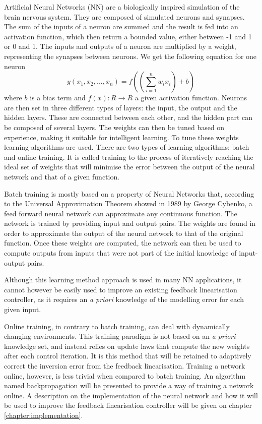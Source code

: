 Artificial Neural Networks (NN) are a biologically inspired simulation of the brain nervous system. They are composed of simulated neurons and synapses. The sum of the inputs of a neuron are summed and the result is fed into an activation function, which then return a bounded value, either between -1 and 1 or 0 and 1. The inputs and outputs of a neuron are multiplied by a weight, representing the synapses between neurons. We get the following equation for one neuron
\begin{equation}
y(x_1,x_2,...,x_n)=f((\sum ^n_{i=1} w_i x_i)+b)
\end{equation}
where $b$ is a bias term and $f(x):R\rightarrow R$ a given activation function. Neurons are then set in three different types of layers: the input, the output and the hidden layers. These are connected between each other, and the hidden part can be composed of several layers. The weights can then be tuned based on experience, making it suitable for intelligent learning. To tune these weights learning algorithms are used. There are two types of learning algorithms: batch and online training. It is called training to the process of iteratively reaching the ideal set of weights that will minimise the error between the output of the neural network and that of a given function.

Batch training is mostly based on a property of Neural Networks that, according to the Universal Approximation Theorem showed in 1989 by George Cybenko, a feed forward neural network can approximate any continuous function. The network is trained by providing input and output pairs. The weights are found in order to approximate the output of the neural network to that of the original function. Once these weights are computed, the network can then be used to compute outputs from inputs that were not part of the initial knowledge of input-output pairs.

Although this learning method approach is used in many NN applications, it cannot however be easily used to improve an existing feedback linearisation  controller, as it requires an \textit{a priori} knowledge of the modelling error for each given input.

Online training, in contrary to batch training, can deal with dynamically changing environments. This training paradigm is not based on an \textit{a priori} knowledge set, and instead relies on update laws that compute the new weights after each control iteration. It is this method that will be retained to adaptively correct the inversion error from the feedback linearisation. Training a network online, however, is less trivial when compared to batch training. An algorithm named backpropagation will be presented to provide a way of training a network online. A description on the implementation of the neural network and how it will be used to improve the feedback linearisation controller will be given on chapter \ref{chapter:implementation}.


